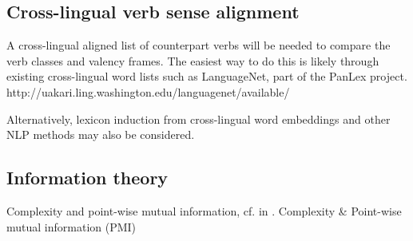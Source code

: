 \subsection{Cross-lingual verb sense alignment}\label{subsec:verblist}

A cross-lingual aligned list of counterpart verbs will be needed to compare the verb classes and valency frames. The easiest way to do this is likely through existing cross-lingual word lists such as LanguageNet, part of the PanLex project. http://uakari.ling.washington.edu/languagenet/available/

Alternatively, lexicon induction from cross-lingual word embeddings and other NLP methods may also be considered.

\subsection{Information theory}\label{subsec:infotheory}

Complexity and point-wise mutual information, cf. in \citet{say2014}.
Complexity \& Point-wise mutual information (PMI)